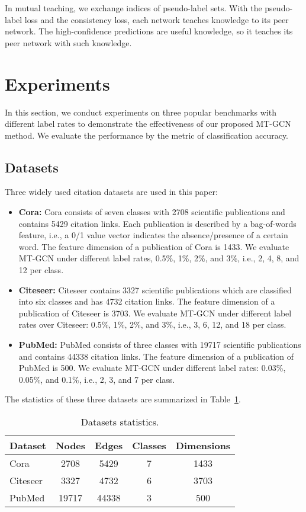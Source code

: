 \documentclass{article}
\begin{document}
In mutual teaching, we exchange indices of pseudo-label sets. With the pseudo-label loss and the consistency loss, each network teaches knowledge to its peer network. The high-confidence predictions are useful knowledge, so it teaches its peer network with such knowledge.
\section{Experiments}\label{Experiments}
In this section, we conduct experiments on three popular benchmarks with different label rates to demonstrate the effectiveness of our proposed MT-GCN method. We evaluate the performance by the metric of classification accuracy.
\subsection{Datasets}
Three widely used  citation datasets are used in this paper:
\begin{itemize}
    \item {\bf Cora:} Cora consists of seven classes with 2708 scientific publications and contains 5429 citation links. Each publication is described by a bag-of-words feature, i.e., a 0/1 value vector indicates the absence/presence of a certain word. The feature dimension of a publication of Cora is 1433. We evaluate MT-GCN under different label rates, 0.5\%, 1\%, 2\%, and 3\%, i.e., 2, 4, 8, and 12 per class.

  \item {\bf Citeseer:} Citeseer contains 3327 scientific publications which are classified into six classes and has 4732 citation links. The feature dimension of a publication of Citeseer is 3703. We evaluate MT-GCN under different label rates over Citeseer: 0.5\%, 1\%, 2\%, and 3\%, i.e., 3, 6, 12, and 18 per class.

  \item {\bf PubMed:} PubMed consists of three classes with 19717 scientific publications and contains 44338 citation links. The feature dimension of a publication of PubMed is 500. We evaluate MT-GCN under different label rates: 0.03\%, 0.05\%, and 0.1\%, i.e., 2, 3, and 7 per class.
\end{itemize}

The statistics of these three datasets are summarized in Table~\ref{dataset}.
\begin{table}[!ht]
  \caption{Datasets statistics.}
  \label{dataset}
  \centering
  \begin{tabular}{l|cccc}
    \hline
    Dataset & Nodes & Edges & Classes & Dimensions \\
    \hline
    Cora & 2708 & 5429 & 7 & 1433 \\
    Citeseer & 3327 & 4732 & 6 & 3703 \\
    PubMed & 19717 & 44338 & 3 & 500 \\
    \hline
  \end{tabular}
\end{table}
\end{document}
